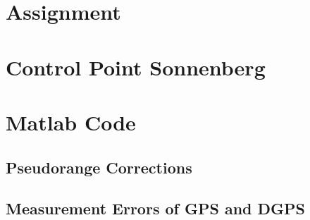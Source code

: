 \chapter{Assignment}\label{appendix:assignment}



\chapter{Control Point Sonnenberg}\label{appendix:control_point_sonnenberg}



\chapter{Matlab Code}\label{appendix:matlab_code}

\section{Pseudorange Corrections}




\section{Measurement Errors of GPS and DGPS}





